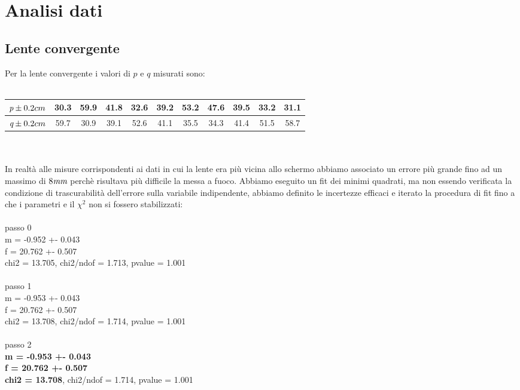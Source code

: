 \documentclass{article}
\begin{document}
	\section{Analisi dati}
		\subsection{Lente convergente}
		Per la lente convergente i valori di $p$ e $q$ misurati sono:\\\\
		\begin{tabular}{ccccccccccc} 
			$\emph{p} \pm 0.2 cm$& 30.3& 59.9& 41.8& 32.6& 39.2& 53.2& 47.6& 39.5& 33.2& 31.1 \\
			\hline
			$\emph{q} \pm 0.2 cm$& 59.7& 30.9& 39.1& 52.6& 41.1& 35.5& 34.3& 41.4& 51.5& 58.7   
		\end{tabular} \\\\
		In realt\`{a} alle misure corrispondenti ai dati in cui la lente era pi\`{u} vicina allo schermo abbiamo associato un errore pi\`{u} grande fino ad un massimo di $8\emph{mm}$ perch\`{e} risultava pi\`{u} difficile la messa a fuoco.
		Abbiamo eseguito un fit dei minimi quadrati, ma non essendo verificata la condizione di trascurabilit\`{a} dell'errore sulla variabile indipendente, abbiamo definito le incertezze efficaci e iterato la procedura di fit fino a che i parametri e il $\chi^2$ non si fossero stabilizzati:\\\\
		passo 0\\
		m = -0.952 +- 0.043\\
		f = 20.762 +- 0.507\\
		chi2 = 13.705, chi2/ndof = 1.713, pvalue = 1.001\\\\
		passo 1\\
		m = -0.953 +- 0.043\\
		f = 20.762 +- 0.507\\
		chi2 = 13.708, chi2/ndof = 1.714, pvalue = 1.001\\\\
		passo 2\\
		\textbf{m = -0.953 +- 0.043}\\
		\textbf{f = 20.762 +- 0.507}\\
		\textbf{chi2 = 13.708}, chi2/ndof = 1.714, pvalue = 1.001\\
\end{document}

